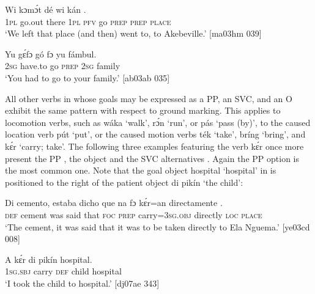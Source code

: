 \ea%
    \label{ex:key:955}
    \gll Wi  kɔmɔ́t  dé    wi  kán        .\\
\textsc{1pl}  go.out  there  \textsc{1pl}  \textsc{pfv}  go  \textsc{prep}  \textsc{prep}  \textsc{place}\\

\glt ‘We left that place (and then) went to, to Akebeville.’ [ma03hm 039]
\z


\ea%
    \label{ex:key:956}
    \gll Yu  gɛ́fɔ    gó  fɔ  yu  fámbul.\\
\textsc{2sg}  have.to  go  \textsc{prep}  \textsc{2sg}  family\\

\glt ‘You had to go to your family.’ [ab03ab 035]
\z

All other verbs in  whose goals may be expressed as a PP, an SVC, and an O exhibit the same pattern with respect to ground marking. This applies to locomotion verbs, such as wáka ‘walk’, rɔ́n ‘run’, or pás ‘pass (by)’, to the caused location verb pút ‘put’, or the caused motion verbs ték ‘take’, bríng ‘bring’, and kɛ́r ‘carry; take’. The following three examples featuring the verb kɛ́r once more present the PP , the object  and the SVC alternatives . Again the PP option is the most common one. Note that the goal object hospital ‘hospital’ in  is positioned to the right of the patient object di pikín ‘the child’: 


\ea%
    \label{ex:key:957}
    \gll Di  cemento,  estaba  dicho  que    na  fɔ  kɛ́r=an
directamente    { }.\\
\textsc{def}  cement    was    said    that    \textsc{foc}  \textsc{prep}  carry=\textsc{3sg.obj} 
directly    \textsc{loc}  \textsc{place}\\

\glt ‘The cement, it was said that it was to be taken directly to Ela Nguema.’ [ye03cd 008]
\z


\ea%
    \label{ex:key:958}
    \gll A    kɛ́r    di  pikín  hospital.{\fff}\\
\textsc{1sg.sbj}  carry  \textsc{def}  child  hospital\\

\glt ‘I took the child to hospital.’ [dj07ae 343]
\z


